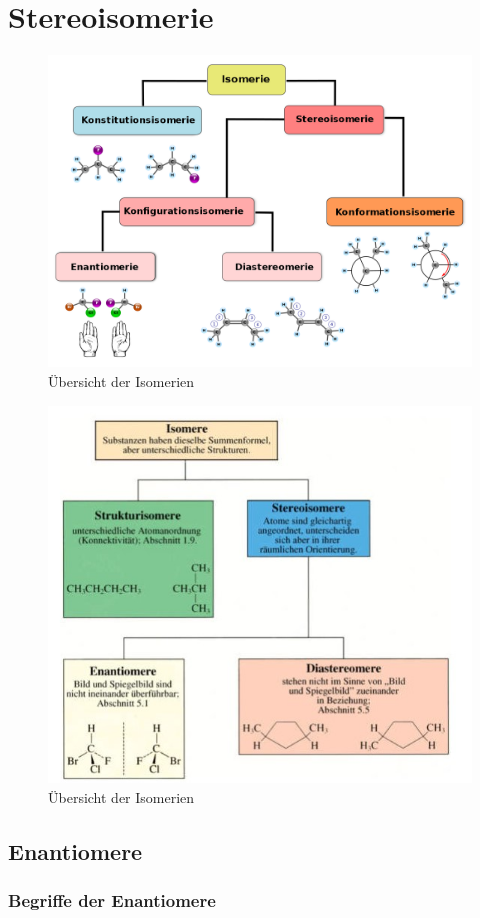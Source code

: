 \chapter{Stereoisomerie}

\begin{figure}[h!]
	\centering
	\includegraphics[width=0.75\linewidth]{img/isomerie}
	\caption{Übersicht der Isomerien}
	\label{fig:isomerie}
\end{figure}
\FloatBarrier

\begin{figure}[h!]
	\centering
	\includegraphics[width=0.75\linewidth]{img/isomerie2}
	\caption{Übersicht der Isomerien}
	\label{fig:isomerie2}
\end{figure}
\FloatBarrier

\section{Enantiomere}

\subsection{Begriffe der Enantiomere}

